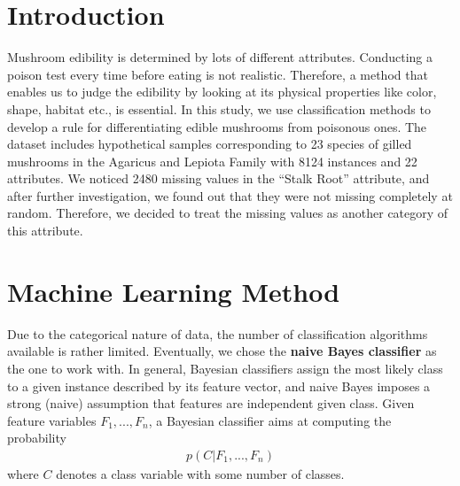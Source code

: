 \documentclass{article}
\begin{document}


\begin{multicols}{2}
\section{Introduction}
Mushroom edibility is determined by lots of different attributes. Conducting a poison test every time before eating is not realistic. Therefore, a method that enables us to judge the edibility by looking at its physical properties like color, shape, habitat etc., is essential. In this study, we use classification methods to develop a rule for differentiating edible mushrooms from poisonous ones. The dataset includes hypothetical samples corresponding to 23 species of gilled mushrooms in the Agaricus and Lepiota Family with 8124 instances and 22 attributes. We noticed 2480 missing values in the “Stalk Root” attribute, and after further investigation, we found out that they were not missing completely at random. Therefore, we decided to treat the missing values as another category of this attribute. 

\section{Machine Learning Method}
Due to the categorical nature of data, the number of classification algorithms available is rather limited. Eventually, we chose the \textbf{naive Bayes classifier} as the one to work with. In general, Bayesian classifiers assign the most likely class to a given instance described by its feature vector, and naive Bayes imposes a strong (naive) assumption that features are independent given class. Given feature variables $F_1,...,F_n$, a Bayesian classifier aims at computing the probability
\begin{align*}
p(C\vert F_1,...,F_n)
\end{align*}
where $C$ denotes a class variable with some number of classes.\\


\end{multicols}
\end{document}
